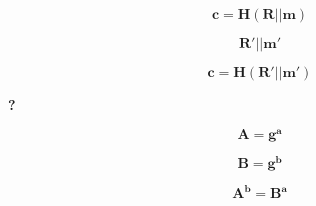 \documentclass{article}
\begin{document}
\Huge
\[ \bm{ c = H(R || m ) } \]

\[ \bm{R' || m' } \]

\[ \bm{c = H(R' || m') } \]

{ \Large \textbf{?} }

\[ \bm{A = g^a } \]

\[ \bm{B = g^b } \]

\[ \bm{A^b = B^a } \]
\end{document}
